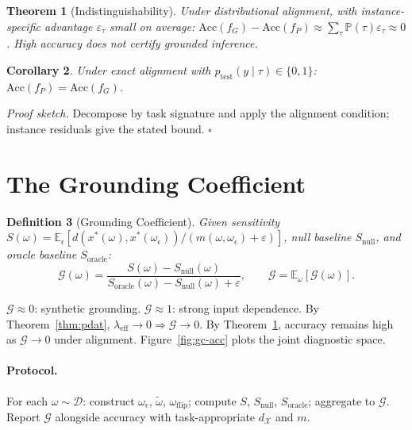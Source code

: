 \documentclass[twocolumn,10pt]{article}
\theoremstyle{thmstyle}
\newtheorem{theorem}{Theorem}[section]
\newtheorem{corollary}[theorem]{Corollary}
\theoremstyle{defstyle}
\newtheorem{definition}[theorem]{Definition}
\newcommand{\Xspace}{\mathcal{X}}
\newcommand{\GC}{\mathcal{G}}
\newcommand{\leff}{\lambda_{\mathrm{eff}}}
\begin{document}
\begin{theorem}[Indistinguishability]
\label{thm:indisc}
Under distributional alignment, with instance-specific advantage
$\varepsilon_\tau$ small on average:
$\mathrm{Acc}(f_G)-\mathrm{Acc}(f_P)\approx
\sum_\tau\mathbb{P}(\tau)\varepsilon_\tau\approx 0$.
High accuracy does not certify grounded inference.
\end{theorem}

\begin{corollary}
Under exact alignment with $p_{\mathrm{test}}(y\mid\tau)\in\{0,1\}$:
$\mathrm{Acc}(f_P)=\mathrm{Acc}(f_G)$.
\end{corollary}

\noindent\textit{Proof sketch.} Decompose by task signature and apply the
alignment condition; instance residuals give the stated bound.
\hfill$\square$

\section{The Grounding Coefficient}
\label{app:gc}

\begin{definition}[Grounding Coefficient]
Given sensitivity $S(\omega) = \mathbb{E}_\epsilon[d(x^*(\omega),
x^*(\omega_\epsilon)) / (m(\omega,\omega_\epsilon)+\varepsilon)]$,
null baseline $S_{\mathrm{null}}$, and oracle baseline
$S_{\mathrm{oracle}}$:
\[
  \GC(\omega) = \frac{S(\omega)-S_{\mathrm{null}}(\omega)}
  {S_{\mathrm{oracle}}(\omega)-S_{\mathrm{null}}(\omega)+\varepsilon},
  \qquad
  \GC = \mathbb{E}_\omega[\GC(\omega)].
\]
\end{definition}

$\GC\approx 0$: synthetic grounding. $\GC\approx 1$: strong input
dependence. By Theorem~\ref{thm:pdat}, $\leff\to 0\Rightarrow\GC\to 0$.
By Theorem~\ref{thm:indisc}, accuracy remains high as $\GC\to 0$ under
alignment. Figure~\ref{fig:gc-acc} plots the joint diagnostic space.

\paragraph{Protocol.} For each $\omega\sim\mathcal{D}$: construct
$\omega_\epsilon$, $\tilde\omega$, $\omega_{\mathrm{flip}}$; compute
$S$, $S_{\mathrm{null}}$, $S_{\mathrm{oracle}}$; aggregate to $\GC$.
Report $\GC$ alongside accuracy with task-appropriate $d_\Xspace$ and $m$.



\end{document}
